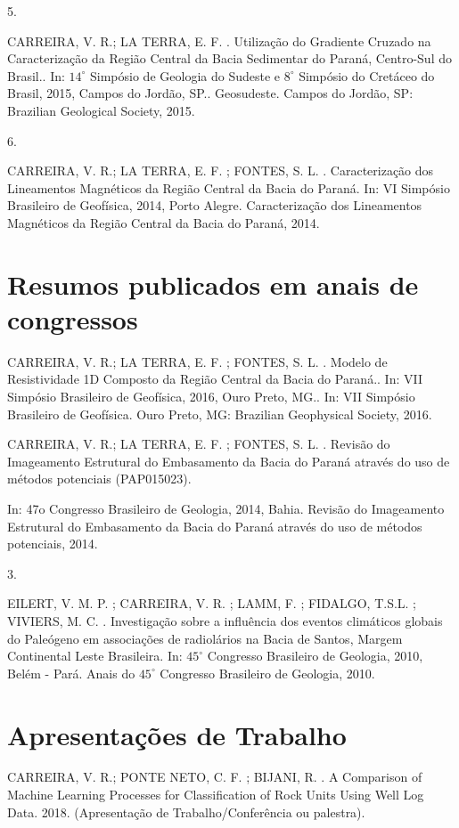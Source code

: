 \documentclass[10pt]{article}
\begin{document}
5.

CARREIRA, V. R.; LA TERRA, E. F. . Utilização do Gradiente Cruzado na Caracterização da Região Central da Bacia Sedimentar do Paraná, Centro-Sul do Brasil.. In: $14^{\circ}$ Simpósio de Geologia do Sudeste e $8^{\circ}$ Simpósio do Cretáceo do Brasil, 2015, Campos do Jordão, SP.. Geosudeste. Campos do Jordão, SP: Brazilian Geological Society, 2015.

6.

CARREIRA, V. R.; LA TERRA, E. F. ; FONTES, S. L. . Caracterização dos Lineamentos Magnéticos da Região Central da Bacia do Paraná. In: VI Simpósio Brasileiro de Geofísica, 2014, Porto Alegre. Caracterização dos Lineamentos Magnéticos da Região Central da Bacia do Paraná, 2014.

\section*{Resumos publicados em anais de congressos}
CARREIRA, V. R.; LA TERRA, E. F. ; FONTES, S. L. . Modelo de Resistividade 1D Composto da Região Central da Bacia do Paraná.. In: VII Simpósio Brasileiro de Geofísica, 2016, Ouro Preto, MG.. In: VII Simpósio Brasileiro de Geofísica. Ouro Preto, MG: Brazilian Geophysical Society, 2016.

CARREIRA, V. R.; LA TERRA, E. F. ; FONTES, S. L. . Revisão do Imageamento Estrutural do Embasamento da Bacia do Paraná através do uso de métodos potenciais (PAP015023).

In: 47o Congresso Brasileiro de Geologia, 2014, Bahia. Revisão do Imageamento Estrutural do Embasamento da Bacia do Paraná através do uso de métodos potenciais, 2014.

3.

EILERT, V. M. P. ; CARREIRA, V. R. ; LAMM, F. ; FIDALGO, T.S.L. ; VIVIERS, M. C. . Investigação sobre a influência dos eventos climáticos globais do Paleógeno em associações de radiolários na Bacia de Santos, Margem Continental Leste Brasileira. In: $45^{\circ}$ Congresso Brasileiro de Geologia, 2010, Belém - Pará. Anais do $45^{\circ}$ Congresso Brasileiro de Geologia, 2010.

\section*{Apresentações de Trabalho}
CARREIRA, V. R.; PONTE NETO, C. F. ; BIJANI, R. . A Comparison of Machine Learning Processes for Classification of Rock Units Using Well Log Data. 2018. (Apresentação de Trabalho/Conferência ou palestra).
\end{document}
